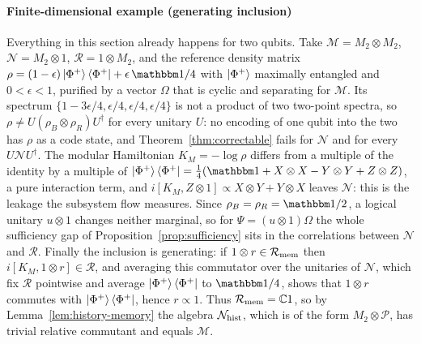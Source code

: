 \documentclass[a4paper,11pt]{article}
\theoremstyle{definition}
\begin{document}
\paragraph{Finite-dimensional example (generating inclusion)}
Everything in this section already happens for two qubits. Take $\mathcal M=M_2\otimes M_2$, $\mathcal N=M_2\otimes1$, $\mathcal R=1\otimes M_2$, and the reference density matrix $\rho=(1-\epsilon)\ket{\Phi^+}\bra{\Phi^+}+\epsilon\,\mathbbm 1/4$ with $\ket{\Phi^+}$ maximally entangled and $0<\epsilon<1$, purified by a vector $\Omega$ that is cyclic and separating for $\mathcal M$. Its spectrum $\{1-3\epsilon/4,\epsilon/4,\epsilon/4,\epsilon/4\}$ is not a product of two two-point spectra, so $\rho\ne U(\rho_B\otimes\rho_R)U^\dagger$ for every unitary $U$: no encoding of one qubit into the two has $\rho$ as a code state, and Theorem~\ref{thm:correctable} fails for $\mathcal N$ and for every $U\mathcal NU^\dagger$. The modular Hamiltonian $K_M=-\log\rho$ differs from a multiple of the identity by a multiple of $\ket{\Phi^+}\bra{\Phi^+}=\tfrac14(\mathbbm 1+X\otimes X-Y\otimes Y+Z\otimes Z)$, a pure interaction term, and $i[K_M,Z\otimes1]\propto X\otimes Y+Y\otimes X$ leaves $\mathcal N$: this is the leakage the subsystem flow measures. Since $\rho_B=\rho_R=\mathbbm 1/2$, a logical unitary $u\otimes1$ changes neither marginal, so for $\Psi=(u\otimes1)\Omega$ the whole sufficiency gap of Proposition~\ref{prop:sufficiency} sits in the correlations between $\mathcal N$ and $\mathcal R$. Finally the inclusion is generating: if $1\otimes r\in\mathcal R_{\rm mem}$ then $i[K_M,1\otimes r]\in\mathcal R$, and averaging this commutator over the unitaries of $\mathcal N$, which fix $\mathcal R$ pointwise and average $\ket{\Phi^+}\bra{\Phi^+}$ to $\mathbbm 1/4$, shows that $1\otimes r$ commutes with $\ket{\Phi^+}\bra{\Phi^+}$, hence $r\propto1$. Thus $\mathcal R_{\rm mem}=\mathbb C1$, so by Lemma~\ref{lem:history-memory} the algebra $\mathcal N_{\rm hist}$, which is of the form $M_2\otimes\mathcal P$, has trivial relative commutant and equals $\mathcal M$. 
\end{document}
